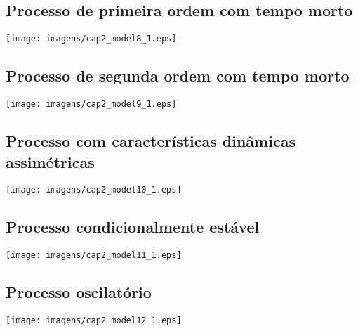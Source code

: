 \subsection{Processo de primeira ordem com tempo morto}

    \begin{center}
        \texttt{[image: imagens/cap2\_model8\_1.eps]}
    \end{center}

\subsection{Processo de segunda ordem com tempo morto}

    \begin{center}
        \texttt{[image: imagens/cap2\_model9\_1.eps]}
    \end{center}

\subsection{Processo com características dinâmicas assimétricas}

    \begin{center}
        \texttt{[image: imagens/cap2\_model10\_1.eps]}
    \end{center}

\subsection{Processo condicionalmente estável}

    \begin{center}
        \texttt{[image: imagens/cap2\_model11\_1.eps]}
    \end{center}

\subsection{Processo oscilatório}

    \begin{center}
        \texttt{[image: imagens/cap2\_model12\_1.eps]}
    \end{center}

